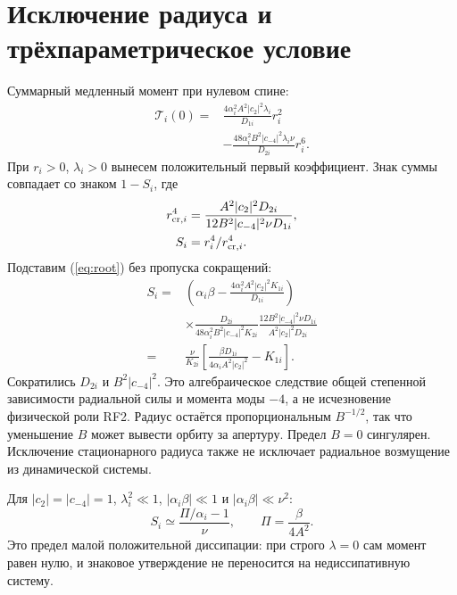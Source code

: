 \documentclass[aip,cha,reprint,a4paper,amsmath,amssymb]{revtex4-2}
\begin{document}
\section{Исключение радиуса и трёхпараметрическое условие}
Суммарный медленный момент при нулевом спине:
\begin{equation}\begin{split}
\mathcal T_i(0)={}&\frac{4\alpha_i^2A^2|c_2|^2\lambda_i}{D_{1i}}r_i^2\\
&-\frac{48\alpha_i^2B^2|c_{-4}|^2\lambda_i\nu}{D_{2i}}r_i^6.
\end{split}\end{equation}
При $r_i>0$, $\lambda_i>0$ вынесем положительный первый коэффициент. Знак суммы совпадает со знаком $1-S_i$, где
\begin{equation}\begin{aligned}
r_{{\rm cr},i}^4&=\frac{A^2|c_2|^2D_{2i}}{12B^2|c_{-4}|^2\nu D_{1i}},\\
S_i&=r_i^4/r_{{\rm cr},i}^4.
\end{aligned}\end{equation}
Подставим (\ref{eq:root}) без пропуска сокращений:
\begin{equation}\begin{split}
S_i={}&\left(\alpha_i\beta-
\frac{4\alpha_i^2A^2|c_2|^2K_{1i}}{D_{1i}}\right)\\
&\times\frac{D_{2i}}{48\alpha_i^2B^2|c_{-4}|^2K_{2i}}
\frac{12B^2|c_{-4}|^2\nu D_{1i}}{A^2|c_2|^2D_{2i}}\\
={}&\frac{\nu}{K_{2i}}\left[
\frac{\beta D_{1i}}{4\alpha_iA^2|c_2|^2}-K_{1i}\right].
\end{split}\label{eq:S}\end{equation}
Сократились $D_{2i}$ и $B^2|c_{-4}|^2$. Это алгебраическое следствие общей степенной зависимости радиальной силы и момента моды $-4$, а не исчезновение физической роли RF2. Радиус остаётся пропорциональным $B^{-1/2}$, так что уменьшение $B$ может вывести орбиту за апертуру. Предел $B=0$ сингулярен. Исключение стационарного радиуса также не исключает радиальное возмущение из динамической системы.

Для $|c_2|=|c_{-4}|=1$, $\lambda_i^2\ll1$, $|\alpha_i\beta|\ll1$ и $|\alpha_i\beta|\ll\nu^2$:
\begin{equation}
 S_i\simeq\frac{\Pi/\alpha_i-1}{\nu},\qquad
 \Pi=\frac{\beta}{4A^2}.
\end{equation}
Это предел малой положительной диссипации: при строго $\lambda=0$ сам момент равен нулю, и знаковое утверждение не переносится на недиссипативную систему.
\end{document}
